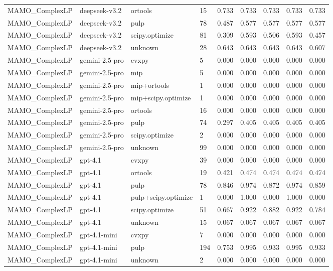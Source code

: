 \begin{table}[t]
\begin{tabular}{lllllllll}
MAMO\_ComplexLP & deepseek-v3.2 & ortools & 15 & 0.733 & 0.733 & 0.733 & 0.733 & 0.733 \\
MAMO\_ComplexLP & deepseek-v3.2 & pulp & 78 & 0.487 & 0.577 & 0.577 & 0.577 & 0.577 \\
MAMO\_ComplexLP & deepseek-v3.2 & scipy.optimize & 81 & 0.309 & 0.593 & 0.506 & 0.593 & 0.457 \\
MAMO\_ComplexLP & deepseek-v3.2 & unknown & 28 & 0.643 & 0.643 & 0.643 & 0.643 & 0.607 \\
MAMO\_ComplexLP & gemini-2.5-pro & cvxpy & 5 & 0.000 & 0.000 & 0.000 & 0.000 & 0.000 \\
MAMO\_ComplexLP & gemini-2.5-pro & mip & 5 & 0.000 & 0.000 & 0.000 & 0.000 & 0.000 \\
MAMO\_ComplexLP & gemini-2.5-pro & mip+ortools & 1 & 0.000 & 0.000 & 0.000 & 0.000 & 0.000 \\
MAMO\_ComplexLP & gemini-2.5-pro & mip+scipy.optimize & 1 & 0.000 & 0.000 & 0.000 & 0.000 & 0.000 \\
MAMO\_ComplexLP & gemini-2.5-pro & ortools & 16 & 0.000 & 0.000 & 0.000 & 0.000 & 0.000 \\
MAMO\_ComplexLP & gemini-2.5-pro & pulp & 74 & 0.297 & 0.405 & 0.405 & 0.405 & 0.405 \\
MAMO\_ComplexLP & gemini-2.5-pro & scipy.optimize & 2 & 0.000 & 0.000 & 0.000 & 0.000 & 0.000 \\
MAMO\_ComplexLP & gemini-2.5-pro & unknown & 99 & 0.000 & 0.000 & 0.000 & 0.000 & 0.000 \\
MAMO\_ComplexLP & gpt-4.1 & cvxpy & 39 & 0.000 & 0.000 & 0.000 & 0.000 & 0.000 \\
MAMO\_ComplexLP & gpt-4.1 & ortools & 19 & 0.421 & 0.474 & 0.474 & 0.474 & 0.474 \\
MAMO\_ComplexLP & gpt-4.1 & pulp & 78 & 0.846 & 0.974 & 0.872 & 0.974 & 0.859 \\
MAMO\_ComplexLP & gpt-4.1 & pulp+scipy.optimize & 1 & 0.000 & 1.000 & 0.000 & 1.000 & 0.000 \\
MAMO\_ComplexLP & gpt-4.1 & scipy.optimize & 51 & 0.667 & 0.922 & 0.882 & 0.922 & 0.784 \\
MAMO\_ComplexLP & gpt-4.1 & unknown & 15 & 0.067 & 0.067 & 0.067 & 0.067 & 0.067 \\
MAMO\_ComplexLP & gpt-4.1-mini & cvxpy & 7 & 0.000 & 0.000 & 0.000 & 0.000 & 0.000 \\
MAMO\_ComplexLP & gpt-4.1-mini & pulp & 194 & 0.753 & 0.995 & 0.933 & 0.995 & 0.933 \\
MAMO\_ComplexLP & gpt-4.1-mini & unknown & 2 & 0.000 & 0.000 & 0.000 & 0.000 & 0.000 \\

\end{tabular}
\end{table}
